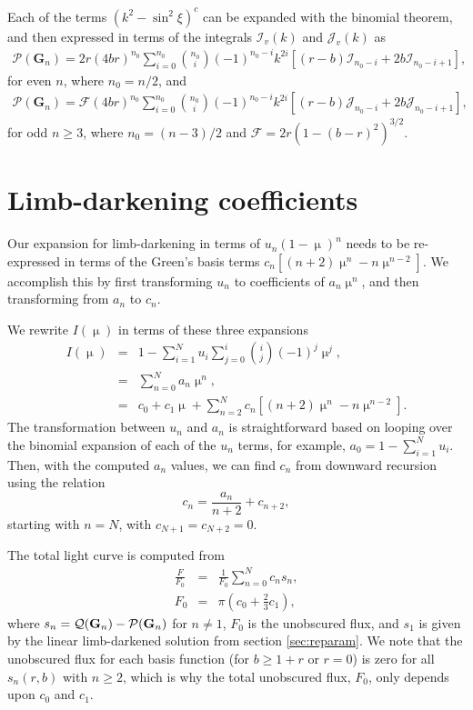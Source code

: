 \documentclass[modern]{aastex61}
\begin{document}
Each of the terms $(k^2-\sin^2\xi)^c$ can be expanded with the binomial theorem,
and then expressed in terms of the integrals $\mathcal{I}_v(k)$ and $\mathcal{J}_v(k)$ as
\begin{eqnarray}
\mathcal{P}(\mathbf{G}_n)
= 2r(4br)^{n_0} \sum_{i=0}^{n_0} \binom{n_0}{i}(-1)^{n_0-i} k^{2i} \left[(r-b)\mathcal{I}_{n_0-i} + 2b \mathcal{I}_{n_0-i+1}\right],
\end{eqnarray}
for even $n$, where $n_0 = n/2$, and
\begin{eqnarray}
\mathcal{P}(\mathbf{G}_n) 
= \mathcal{F}(4br)^{n_0} \sum_{i=0}^{n_0} \binom{n_0}{i} (-1)^{n_0-i} k^{2i} \left[(r-b)\mathcal{J}_{n_0-i} + 2b \mathcal{J}_{n_0-i+1}\right],
\end{eqnarray}
for odd $n \ge 3$, where $n_0 = (n-3)/2$ and
 $\mathcal{F} = 2r(1-(b-r)^2)^{3/2}$.
\section{Limb-darkening coefficients}

Our expansion for limb-darkening in terms of $u_n(1-\upmu)^n$ needs to
be re-expressed in terms of the Green's basis terms $c_n \left[(n+2)\upmu^n -n \upmu^{n-2}\right]$.
We accomplish this by first transforming $u_n$ to coefficients of $a_n \upmu^n$,
and then transforming from $a_n$ to $c_n$.

We rewrite $I(\upmu)$ in terms of these three expansions
\begin{eqnarray}
I(\upmu) &=& 1 - \sum_{i=1}^N u_i \sum_{j=0}^i \binom{i}{j} (-1)^j \upmu^j,\\
&=& \sum_{n=0}^N a_n \upmu^n,\\
&=& c_0 + c_1 \upmu + \sum_{n=2}^N c_n \left[(n+2)\upmu^n -n \upmu^{n-2}\right].
\end{eqnarray}
The transformation between $u_n$ and $a_n$ is straightforward based on
looping over the binomial expansion of each of the $u_n$ terms, for
example, $a_0 = 1 - \sum_{i=1}^N u_i$.  Then,
with the computed $a_n$ values, we can find $c_n$ from downward recursion
using the relation
\begin{equation}
c_n = \frac{a_n}{n+2} + c_{n+2},
\end{equation}
starting with $n=N$, with $c_{N+1}=c_{N+2}=0$.

The total light curve is computed from
\begin{eqnarray}
\frac{F}{F_0} &=& \frac{1}{F_0}\sum_{n=0}^N c_n s_n,\\
F_0 &=& \pi(c_0+ \tfrac{2}{3} c_1),
\end{eqnarray}
where $s_n = \mathcal{Q}({\mathbf{G}}_n) - \mathcal{P}({\mathbf{G}}_n)$ for $n \ne 1$,
$F_0$ is the unobscured flux, and $s_1$ is given by the linear limb-darkened solution 
from section \ref{sec:reparam}.
We note that the unobscured flux for each basis function (for $b \ge 1+r$ or $r=0$) is zero for
all $s_n(r,b)$ with $n \ge 2$, which is why the total unobscured flux,
$F_0$, only depends upon $c_0$ and $c_1$.
\end{document}
